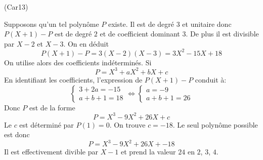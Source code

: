 \begin{tiny}(Car13)\end{tiny} Supposons qu'un tel polynôme $P$ existe. Il est de degré $3$ et unitaire donc $P(X+1)-P$ est de degré $2$ et de coefficient dominant $3$. De plus il est divisible par $X-2$ et $X-3$. On en déduit
\begin{displaymath}
 P(X+1)-P = 3(X-2)(X-3)=3X^2-15X+18
\end{displaymath}
On utilise alors des coefficients indéterminés. Si
\begin{displaymath}
 P = X^3 +aX^2+bX+c
\end{displaymath}
En identifiant les coefficients, l'expression de $P(X+1)-P$ conduit à:
\begin{displaymath}
 \left\lbrace 
\begin{aligned}
 3+2a=-15\\a+b+1=18
\end{aligned}
\right. 
\Leftrightarrow
 \left\lbrace 
\begin{aligned}
 a=-9\\a+b+1=26
\end{aligned}
\right. 
\end{displaymath}
Donc $P$ est de la forme
\begin{displaymath}
 P=X^3-9X^2+26X+c
\end{displaymath}
Le $c$ est déterminé par $P(1)=0$. On trouve $c=-18$.
Le seul polynôme possible est donc
\begin{displaymath}
 P=X^3-9X^2+26X+-18
\end{displaymath}
Il est effectivement divible par $X-1$ et prend la valeur $24$ en $2$, $3$, $4$.